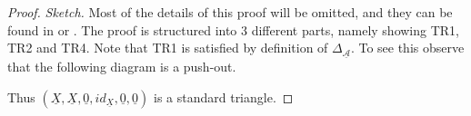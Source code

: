     \begin{proof}\emph{Sketch.}
        Most of the details of this proof will be omitted, and they can be found in \cite{happel} or \cite{May01}. The proof is structured into 3 different parts, namely showing TR1, TR2 and TR4. Note that TR1 is satisfied by definition of $\Delta_{\underline{\mathcal{A}}}$. To see this observe that the following diagram is a push-out.
        \begin{center}
        \end{center}
        Thus $(\underline{X},\underline{X},\underline{0},id_{\underline{X}},\underline{0},\underline{0})$ is a standard triangle.

        

\end{proof}
